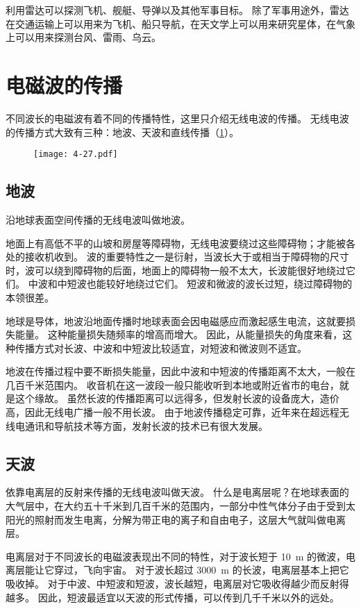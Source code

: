 \medskip
利用雷达可以探测飞机、舰艇、导弹以及其他军事目标。
除了军事用途外，雷达在交通运输上可以用来为飞机、船只导航，在天文学上可以用来研究星体，在气象上可以用来探测台风、雷雨、乌云。

\section{电磁波的传播}
不同波长的电磁波有着不同的传播特性，这里只介绍无线电波的传播。
无线电波的传播方式大致有三种：地波、天波和直线传播（\cref{fig:4-27}）。
\begin{figure}
	\texttt{[image: 4-27.pdf]}
	\caption{}\label{fig:4-27}
\end{figure}

\subsection{地波}

沿地球表面空间传播的无线电波叫做地波。

地面上有高低不平的山坡和房屋等障碍物，无线电波要绕过这些障碍物；才能被各处的接收机收到。
波的重要特性之一是衍射，当波长大于或相当于障碍物的尺寸时，波可以绕到障碍物的后面，地面上的障碍物一般不太大，长波能很好地绕过它们。
中波和中短波也能较好地绕过它们。
短波和微波的波长过短，绕过障碍物的本领很差。

地球是导体，地波沿地面传播时地球表面会因电磁感应而激起感生电流，这就要损失能量。
这种能量损失随频率的增高而增大。
因此，从能量损失的角度来看，这种传播方式对长波、中波和中短波比较适宜，对短波和微波则不适宜。

地波在传播过程中要不断损失能量，因此中波和中短波的传播距离不太大，一般在几百千米范围内。
收音机在这一波段一般只能收听到本地或附近省市的电台，就是这个缘故。
虽然长波的传播距离可以远得多，但发射长波的设备庞大，造价高，因此无线电广播一般不用长波。
由于地波传播稳定可靠，近年来在超远程无线电通讯和导航技术等方面，发射长波的技术已有很大发展。

\subsection{天波}

依靠电离层的反射来传播的无线电波叫做天波。
什么是电离层呢？在地球表面的大气层中，在大约五十千米到几百千米的范围内，一部分中性气体分子由于受到太阳光的照射而发生电离，分解为带正电的离子和自由电子，这层大气就叫做电离层。

电离层对于不同波长的电磁波表现出不同的特性，对于波长短于 \qty{10}{m} 的微波，电离层能让它穿过，飞向宇宙。
对于波长超过 \qty{3000}{m} 的长波，电离层基本上把它吸收掉。
对于中波、中短波和短波，波长越短，电离层对它吸收得越少而反射得越多。
因此，短波最适宜以天波的形式传播，可以传到几千千米以外的远处。


